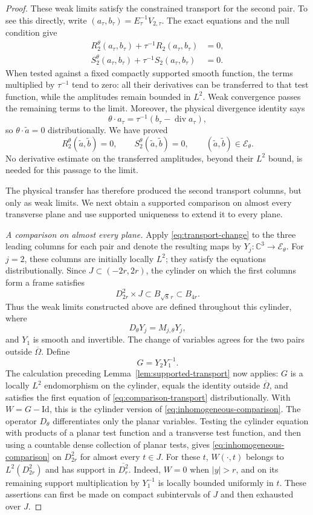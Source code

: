 \documentclass[11pt]{article}
\newcommand{\C}{\mathbb C}
\newcommand{\Id}{\mathrm{Id}}
\DeclareMathOperator{\diverg}{div}
\newcommand{\Ecal}{\mathcal E}
\theoremstyle{remark}
\numberwithin{equation}{section}
\begin{document}
\begin{proof}
These weak limits satisfy the constrained transport for the second
pair. To see this directly, write
$(a_\tau,b_\tau)=E_\tau^{-1}V_{2,\tau}$. The exact equations and
the null condition give
\[
 \begin{aligned}
 R_2^\theta(a_\tau,b_\tau)
       +\tau^{-1}R_2(a_\tau,b_\tau)&=0,\\
 S_2^\theta(a_\tau,b_\tau)
       +\tau^{-1}S_2(a_\tau,b_\tau)&=0.
 \end{aligned}
\]
When tested against a fixed compactly supported smooth function,
the terms multiplied by $\tau^{-1}$ tend to zero: all their
derivatives can be transferred to that test function, while the
amplitudes remain bounded in $L^2$. Weak convergence passes the
remaining terms to the limit. Moreover, the physical divergence
identity says
\[
 \theta\cdot a_\tau
   =\tau^{-1}(b_\tau-\diverg a_\tau),
\]
so $\theta\cdot\widetilde a=0$ distributionally. We have proved
\[
 R_2^\theta(\widetilde a,\widetilde b)=0,
 \qquad S_2^\theta(\widetilde a,\widetilde b)=0,
 \qquad (\widetilde a,\widetilde b)\in\Ecal_\theta.
\]
No derivative estimate on the transferred amplitudes, beyond their
$L^2$ bound, is needed for this passage to the limit.

The physical transfer has therefore produced the second transport
columns, but only as weak limits. We next obtain a supported comparison
on almost every transverse plane and use supported uniqueness to extend
it to every plane.

\emph{A comparison on almost every plane.}
Apply \eqref{eq:transport-change} to the three leading columns for
each pair and denote the resulting maps by
$Y_j:\C^3\to\Ecal_\theta$. For $j=2$, these columns are initially
locally $L^2$; they satisfy the equations distributionally. Since
$J\subset(-2r,2r)$, the cylinder on which the first columns form a frame
satisfies
\[
 D_{2r}^2\times J\subset B_{\sqrt8\,r}\subset B_{4r}.
\]
Thus the weak limits constructed above are defined throughout this
cylinder, where
\[
 D_\theta Y_j=M_{j,\theta}Y_j,
\]
and $Y_1$ is smooth and invertible. The change of variables agrees
for the two pairs outside $\overline\Omega$. Define
\[
 G=Y_2Y_1^{-1}.
\]
The calculation preceding Lemma~\ref{lem:supported-transport} now applies:
$G$ is a locally $L^2$ endomorphism on the cylinder, equals the identity
outside $\overline\Omega$, and satisfies the first equation of
\eqref{eq:comparison-transport} distributionally. With $W=G-\Id$, this
is the cylinder version of \eqref{eq:inhomogeneous-comparison}.
The operator $D_\theta$ differentiates only the planar variables.
Testing the cylinder equation with products of a planar test
function and a transverse test function, and then using a countable
dense collection of planar tests, gives
\eqref{eq:inhomogeneous-comparison} on $D_{2r}^2$ for almost every
$t\in J$. For these $t$, $W(\cdot,t)$ belongs to $L^2(D_{2r}^2)$
and has support in $\overline{D_r^2}$. Indeed, $W=0$ when $|y|>r$,
and on its remaining support multiplication by $Y_1^{-1}$ is locally
bounded uniformly in $t$. These assertions can first be made on
compact subintervals of $J$ and then exhausted over $J$.


\end{proof}
\end{document}
